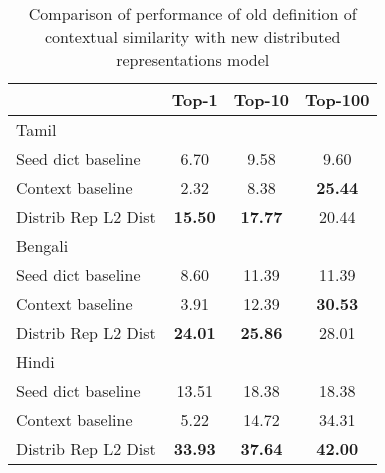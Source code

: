 \documentclass[11pt]{article}
\begin{document}
\begin{table}
\begin{center}
\begin{tabular}{|l|c|c|c|}
\hline
& Top-1 & Top-10 & Top-100 \\
\hline
\multicolumn{4}{|l|}{Tamil}  \\
\hline
Seed dict baseline & 6.70 & 9.58 & 9.60 \\
Context baseline & 2.32 & 8.38 & {\bf 25.44} \\ 
Distrib Rep L2 Dist & {\bf 15.50} & {\bf 17.77} & 20.44 \\
\hline
\multicolumn{4}{|l|}{Bengali}  \\
\hline
Seed dict baseline & 8.60 & 11.39 & 11.39 \\
Context baseline & 3.91 & 12.39 & {\bf 30.53} \\
Distrib Rep L2 Dist & {\bf 24.01} & {\bf 25.86} & 28.01 \\
\hline
\multicolumn{4}{|l|}{Hindi}  \\
\hline
Seed dict baseline & 13.51 & 18.38 & 18.38 \\
Context baseline & 5.22 & 14.72 & 34.31 \\
Distrib Rep L2 Dist & {\bf 33.93} & {\bf 37.64} & {\bf 42.00} \\
\hline
\end{tabular}
\end{center}
\caption{Comparison of performance of old definition of contextual similarity with new distributed representations model}\label{accresults}
\vspace{-.35cm}
\end{table}

\end{document}
